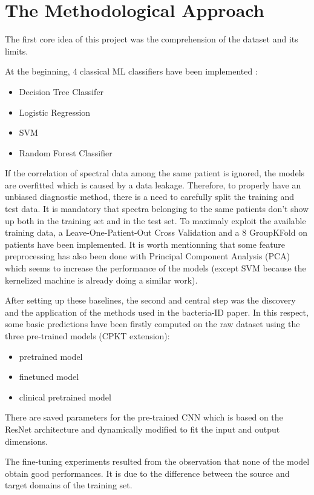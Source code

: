 \section{The Methodological Approach}

The first core idea of this project was the comprehension of the dataset and its limits.  

At the beginning, 4 classical ML classifiers have been implemented :
\begin{itemize}
\item Decision Tree Classifer
\item Logistic Regression 
\item SVM
\item Random Forest Classifier
\end{itemize}

If the correlation of spectral data among the same patient is ignored, the models are overfitted which is caused by a data leakage.
Therefore, to properly have an unbiased diagnostic method, there is a need to carefully split the training and test data. It is mandatory that spectra belonging to the same patients don't show up both in the training set and in the test set.
To maximaly exploit the available training data, a Leave-One-Patient-Out Cross Validation and a 8 GroupKFold on patients have been implemented. 
It is worth mentionning that some feature preprocessing has also been done with Principal Component Analysis (PCA) which seems to increase the performance of the models (except SVM because the kernelized machine is already doing a similar work).

After setting up these baselines, the second and central step was the discovery and the application of the methods used in the bacteria-ID paper\cite{bacteria-ID}. In this respect, some basic predictions have been firstly computed on the raw dataset using the three pre-trained models (CPKT extension): 
\begin{itemize}
\item pretrained model 
\item finetuned model 
\item clinical pretrained model
\end{itemize}
There are saved parameters for the pre-trained CNN which is based on the ResNet architecture and dynamically modified to fit the input and output dimensions.

The fine-tuning experiments resulted from the observation that none of the model obtain good performances. It is due to the difference between the source and target domains of the training set.

